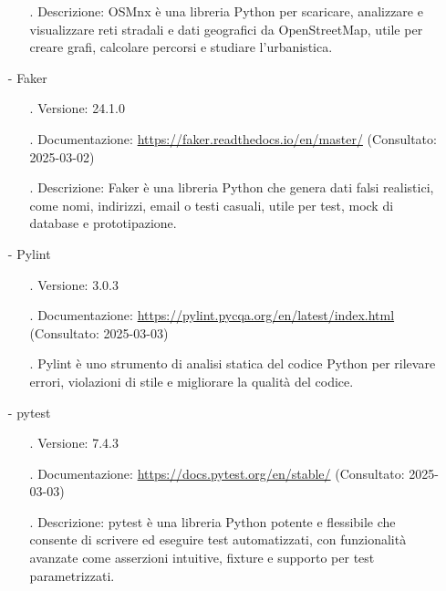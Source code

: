 \documentclass[10pt]{article}
\begin{document}
\begin{justify}
\begin{itemize}
\begin{itemize}
                        \item[.] Descrizione: OSMnx è una libreria Python per scaricare, analizzare e visualizzare reti stradali e dati geografici da OpenStreetMap, 
                        utile per creare grafi, calcolare percorsi e studiare l’urbanistica.
                    \end{itemize}
                \item[-] Faker
                    \begin{itemize}
                        \item[.] Versione: 24.1.0
                        \item[.] Documentazione: \textcolor{blue}{\url{https://faker.readthedocs.io/en/master/}} (Consultato: 2025-03-02)
                        \item[.] Descrizione: Faker è una libreria Python che genera dati falsi realistici, come nomi, indirizzi, email o testi casuali, utile per test, 
                        mock di database e prototipazione.
                    \end{itemize}
                \item[-] Pylint
                    \begin{itemize}
                        \item[.] Versione: 3.0.3
                        \item[.] Documentazione: \textcolor{blue}{\url{https://pylint.pycqa.org/en/latest/index.html}} (Consultato: 2025-03-03)
                        \item[.] Pylint è uno strumento di analisi statica del codice Python per rilevare errori, violazioni di stile e migliorare la qualità del codice.
                    \end{itemize}
                \item[-] pytest
                    \begin{itemize}
                        \item[.] Versione: 7.4.3
                        \item[.] Documentazione: \textcolor{blue}{\url{https://docs.pytest.org/en/stable/}} (Consultato: 2025-03-03)
                        \item[.] Descrizione: pytest è una libreria Python potente e flessibile che consente di scrivere ed eseguire test automatizzati, con funzionalità avanzate come 
                        asserzioni intuitive, fixture e supporto per test parametrizzati.
                    \end{itemize}
            \end{itemize}


\end{justify}
\end{document}
